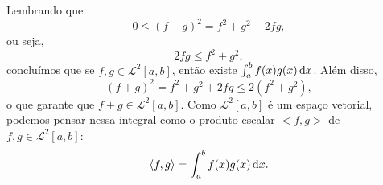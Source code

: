 \begin{obs}
  Lembrando que
  \begin{dmath*}
    0 \leq \left( f - g \right)^2 = f^2 + g^2 - 2 f g,
  \end{dmath*}
  ou seja,
  \begin{dmath*}
    2 f g \leq f^2 + g^2,
  \end{dmath*}
  concluímos que se $f, g \in \mathcal{L}^2[a, b]$, então existe $\int_a^b f(x)
  g(x) \, \mathrm{d}x$. Além disso,
  \begin{dmath*}
    \left( f + g \right)^2 = f^2 + g^2 + 2 f g \leq 2 \left( f^2 + g^2 \right),
  \end{dmath*}
  o que garante que $f + g \in \mathcal{L}^2[a, b]$. Como $\mathcal{L}^2[a, b]$
  é um espaço vetorial, podemos pensar nessa integral como o produto escalar
  $<f, g>$ de $f, g \in \mathcal{L}^2[a, b]$:
  \begin{dmath*}
    \langle f, g \rangle = \int_a^b f(x) g(x) \vi{x}.
  \end{dmath*}
\end{obs}

